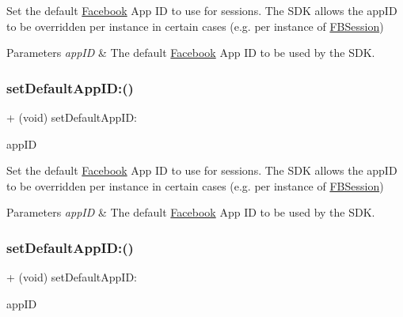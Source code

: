 Set the default \hyperlink{interfaceFacebook}{Facebook} App ID to use for sessions. The S\+DK allows the app\+ID to be overridden per instance in certain cases (e.\+g. per instance of \hyperlink{interfaceFBSession}{F\+B\+Session})


\begin{DoxyParams}{Parameters}
{\em app\+ID} & The default \hyperlink{interfaceFacebook}{Facebook} App ID to be used by the S\+DK. \\
\hline
\end{DoxyParams}
\mbox{\label{interfaceFBSettings_aae75641f83b1caf710efd2ce72b6eb67}} 
\subsubsection{\texorpdfstring{set\+Default\+App\+I\+D\+:()}{setDefaultAppID:()}\hspace{0.1cm}{\footnotesize\ttfamily [3/5]}}
{\footnotesize\ttfamily + (void) set\+Default\+App\+I\+D\+: \begin{DoxyParamCaption}\item[{(N\+S\+String $\ast$)}]{app\+ID }\end{DoxyParamCaption}}

Set the default \hyperlink{interfaceFacebook}{Facebook} App ID to use for sessions. The S\+DK allows the app\+ID to be overridden per instance in certain cases (e.\+g. per instance of \hyperlink{interfaceFBSession}{F\+B\+Session})


\begin{DoxyParams}{Parameters}
{\em app\+ID} & The default \hyperlink{interfaceFacebook}{Facebook} App ID to be used by the S\+DK. \\
\hline
\end{DoxyParams}
\mbox{\label{interfaceFBSettings_aae75641f83b1caf710efd2ce72b6eb67}} 
\subsubsection{\texorpdfstring{set\+Default\+App\+I\+D\+:()}{setDefaultAppID:()}\hspace{0.1cm}{\footnotesize\ttfamily [4/5]}}
{\footnotesize\ttfamily + (void) set\+Default\+App\+I\+D\+: \begin{DoxyParamCaption}\item[{(N\+S\+String $\ast$)}]{app\+ID }\end{DoxyParamCaption}}

